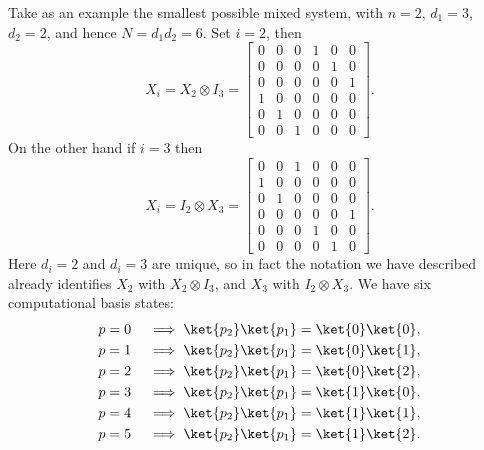 Take as an example the smallest possible mixed system, with $n = 2$, $d_1 = 3$, $d_2 = 2$, and hence $N = d_1d_2 = 6$. Set $i = 2$, then
\[X_i = X_2 \otimes I_3 = \begin{bmatrix}
0 & 0 & 0 & 1 & 0 & 0 \\
0 & 0 & 0 & 0 & 1 & 0 \\
0 & 0 & 0 & 0 & 0 & 1 \\
1 & 0 & 0 & 0 & 0 & 0 \\
0 & 1 & 0 & 0 & 0 & 0 \\
0 & 0 & 1 & 0 & 0 & 0
\end{bmatrix}.\]
On the other hand if $i = 3$ then
\[X_i = I_2 \otimes X_3 = \begin{bmatrix}
	0 & 0 & 1 & 0 & 0 & 0 \\
	1 & 0 & 0 & 0 & 0 & 0 \\
	0 & 1 & 0 & 0 & 0 & 0 \\
	0 & 0 & 0 & 0 & 0 & 1 \\
	0 & 0 & 0 & 1 & 0 & 0 \\
	0 & 0 & 0 & 0 & 1 & 0
\end{bmatrix}.\]
Here $d_i = 2$ and $d_i = 3$ are unique, so in fact the notation we have described already identifies $X_2$ with $X_2 \otimes I_3$, and $X_3$ with $I_2 \otimes X_3$. We have six computational basis states:
\begin{align*}
	p = 0 &&& \implies \ket{p_2}\ket{p_1} = \ket{0}\ket{0}, \\
	p = 1 &&& \implies \ket{p_2}\ket{p_1} = \ket{0}\ket{1}, \\
	p = 2 &&& \implies \ket{p_2}\ket{p_1} = \ket{0}\ket{2}, \\
	p = 3 &&& \implies \ket{p_2}\ket{p_1} = \ket{1}\ket{0}, \\
	p = 4 &&& \implies \ket{p_2}\ket{p_1} = \ket{1}\ket{1}, \\
	p = 5 &&& \implies \ket{p_2}\ket{p_1} = \ket{1}\ket{2}.
\end{align*}

